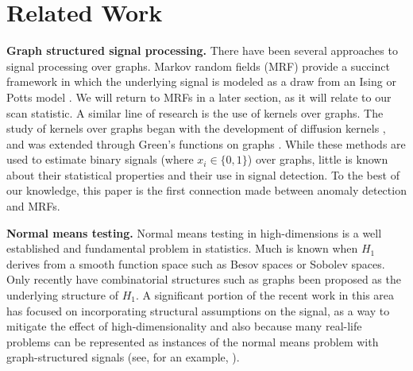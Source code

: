 \vspace{-.2cm}
\section{Related Work}
\label{sec:related}
\vspace{-.2cm}
{\bf Graph structured signal processing.}
There have been several approaches to signal processing over graphs.
Markov random fields (MRF) provide a succinct framework in which the underlying signal is modeled as a draw from an Ising or Potts model \cite{cevher2009sparse,ravikumar2006quadratic}.
We will return to MRFs in a later section, as it will relate to our scan statistic.
A similar line of research is the use of kernels over graphs.
The study of kernels over graphs began with the development of diffusion kernels \cite{kondor2002diffusion}, and was extended through Green's functions on graphs \cite{smola2003kernels}.
While these methods are used to estimate binary signals (where $x_i \in \{0,1\}$) over graphs, little is known about their statistical properties and their use in signal detection.
To the best of our knowledge, this paper is the first connection made between anomaly detection and MRFs.

{\bf Normal means testing.}
Normal means testing in high-dimensions is a well established and fundamental problem in statistics. 
Much is known when $H_1$ derives from a smooth function space such as Besov spaces or Sobolev spaces\cite{ingster1987minimax,ingster2003nonparametric}.
Only recently have combinatorial structures such as graphs been proposed as the underlying structure of $H_1$.
A significant portion of the recent work in this area \cite{arias2005nearoptimal, arias2008searching, arias2011detection,addario2010combinatorial} has focused on incorporating structural assumptions on the signal, as a way to mitigate the effect of high-dimensionality and also because many real-life problems can be represented as instances of the normal means problem with graph-structured signals (see, for an example, \cite{jacob2010gains}).

